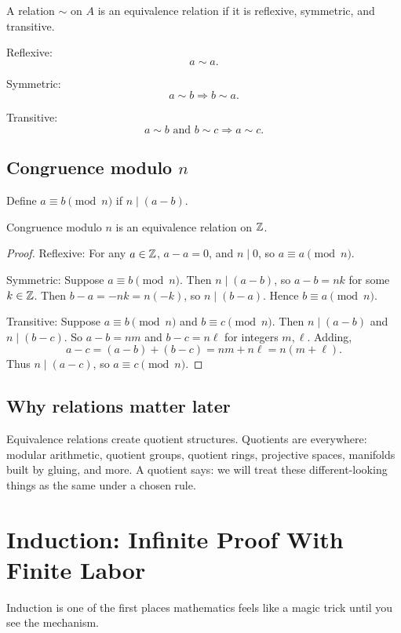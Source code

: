 \documentclass[11pt]{article}
\begin{document}
\begin{definition}
A relation $\sim$ on $A$ is an equivalence relation if it is reflexive, symmetric, and transitive.
\end{definition}

Reflexive:
\[
a\sim a.
\]

Symmetric:
\[
a\sim b\Rightarrow b\sim a.
\]

Transitive:
\[
a\sim b\text{ and }b\sim c\Rightarrow a\sim c.
\]

\subsection{Congruence modulo $n$}

Define $a\equiv b\pmod n$ if $n\mid(a-b)$.

\begin{theorem}
Congruence modulo $n$ is an equivalence relation on $\mathbb{Z}$.
\end{theorem}

\begin{proof}
Reflexive: For any $a\in\mathbb{Z}$, $a-a=0$, and $n\mid0$, so $a\equiv a\pmod n$.

Symmetric: Suppose $a\equiv b\pmod n$. Then $n\mid(a-b)$, so $a-b=nk$ for some $k\in\mathbb{Z}$. Then $b-a=-nk=n(-k)$, so $n\mid(b-a)$. Hence $b\equiv a\pmod n$.

Transitive: Suppose $a\equiv b\pmod n$ and $b\equiv c\pmod n$. Then $n\mid(a-b)$ and $n\mid(b-c)$. So $a-b=nm$ and $b-c=n\ell$ for integers $m,\ell$. Adding,
\[
a-c=(a-b)+(b-c)=nm+n\ell=n(m+\ell).
\]
Thus $n\mid(a-c)$, so $a\equiv c\pmod n$.
\end{proof}

\subsection{Why relations matter later}

Equivalence relations create quotient structures. Quotients are everywhere: modular arithmetic, quotient groups, quotient rings, projective spaces, manifolds built by gluing, and more. A quotient says: we will treat these different-looking things as the same under a chosen rule.

\newpage
\section{Induction: Infinite Proof With Finite Labor}

Induction is one of the first places mathematics feels like a magic trick until you see the mechanism.
\end{document}
